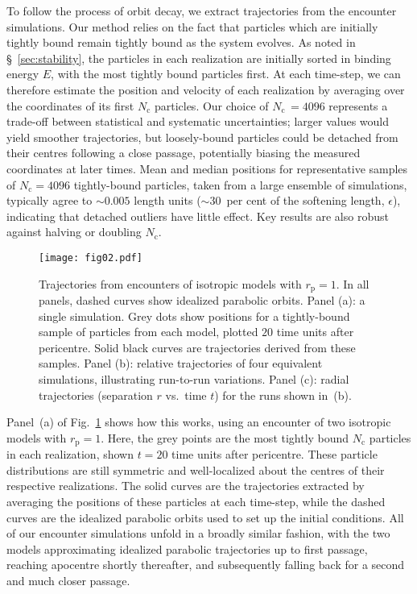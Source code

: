 \documentclass[fleqn,usenatbib]{mnras}
\begin{document}
To follow the process of orbit decay, we extract trajectories from the encounter simulations. Our method relies on the fact that particles which are initially tightly bound remain tightly bound as the system evolves. As noted in \S~\ref{sec:stability}, the particles in each realization are initially sorted in binding energy $E$, with the most tightly bound particles first. At each time-step, we can therefore estimate the position and velocity of each realization by averaging over the coordinates of its first $N_\mathrm{c}$ particles. Our choice of $N_\mathrm{c} \, = 4096$ represents a trade-off between statistical and systematic uncertainties; larger values would yield smoother trajectories, but loosely-bound particles could be detached from their centres following a close passage, potentially biasing the measured coordinates at later times. Mean and median positions for representative samples of $N_\mathrm{c} = 4096$ tightly-bound particles, taken from a large ensemble of simulations, typically agree to $\sim 0.005$ length units ($\sim 30$~per cent of the softening length, $\epsilon$), indicating that detached outliers have little effect. Key results are also robust against halving or doubling $N_\mathrm{c}$.

\begin{figure}
    \centering
    \texttt{[image: fig02.pdf]}
    \caption{Trajectories from encounters of isotropic models with $r_\mathrm{p} = 1$.  In all panels, dashed curves show idealized parabolic orbits. Panel (a): a single simulation. Grey dots show positions for a tightly-bound sample of particles from each model, plotted $20$ time units after pericentre. Solid black curves are trajectories derived from these samples. Panel (b): relative trajectories of four equivalent simulations, illustrating run-to-run variations. Panel (c): radial trajectories (separation $r$ vs.~time $t$) for the runs shown in~(b).}
    \label{fig02}
\end{figure}

Panel~(a) of Fig.~\ref{fig02} shows how this works, using an encounter of two isotropic models with $r_\mathrm{p} = 1$. Here, the grey points are the most tightly bound $N_\mathrm{c}$ particles in each realization, shown $t = 20$ time units after pericentre. These particle distributions are still symmetric and well-localized about the centres of their respective realizations. The solid curves are the trajectories extracted by averaging the positions of these particles at each time-step, while the dashed curves are the idealized parabolic orbits used to set up the initial conditions. All of our encounter simulations unfold in a broadly similar fashion, with the two models approximating idealized parabolic trajectories up to first passage, reaching apocentre shortly thereafter, and subsequently falling back for a second and much closer passage.
\end{document}
